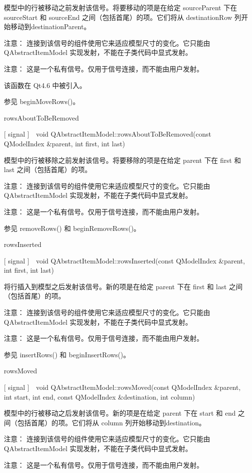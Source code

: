 模型中的行被移动之前发射该信号。将要移动的项是在给定 sourceParent 下在 sourceStart 和 sourceEnd 之间（包括首尾）的项。它们将从 destinationRow 列开始移动到destinationParent。

注意： 连接到该信号的组件使用它来适应模型尺寸的变化。它只能由 QAbstractItemModel 实现发射，不能在子类代码中显式发射。

注意： 这是一个私有信号。仅用于信号连接，而不能由用户发射。

该函数在 Qt4.6 中被引入。

参见 beginMoveRows()。

rowsAboutToBeRemoved

[ signal ] void QAbstractItemModel::rowsAboutToBeRemoved(const QModelIndex \&parent, int first, int last)

模型中的行被移除之前发射该信号。将要移除的项是在给定 parent 下在 first 和 last 之间（包括首尾）的项。

注意： 连接到该信号的组件使用它来适应模型尺寸的变化。它只能由 QAbstractItemModel 实现发射，不能在子类代码中显式发射。

注意： 这是一个私有信号。仅用于信号连接，而不能由用户发射。

参见 removeRows() 和 beginRemoveRows()。

rowsInserted

[ signal ] void QAbstractItemModel::rowsInserted(const QModelIndex \&parent, int first, int last)

将行插入到模型之后发射该信号。新的项是在给定 parent 下在 first 和 last 之间（包括首尾）的项。

注意： 连接到该信号的组件使用它来适应模型尺寸的变化。它只能由 QAbstractItemModel 实现发射，不能在子类代码中显式发射。

注意： 这是一个私有信号。仅用于信号连接，而不能由用户发射。

参见 insertRows() 和 beginInsertRows()。

rowsMoved

[ signal ] void QAbstractItemModel::rowsMoved(const QModelIndex \&parent, int start, int end, const QModelIndex \&destination, int column)

模型中的行被移动之后发射该信号。新的项是在给定 parent 下在 start 和 end 之间（包括首尾）的项。它们将从 column 列开始移动到destination。

注意： 连接到该信号的组件使用它来适应模型尺寸的变化。它只能由 QAbstractItemModel 实现发射，不能在子类代码中显式发射。

注意： 这是一个私有信号。仅用于信号连接，而不能由用户发射。

